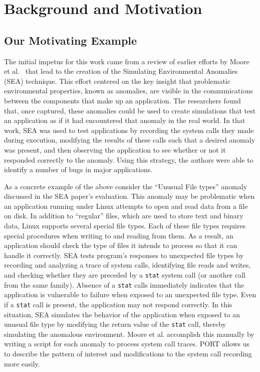 \section{Background and Motivation}
\label{SEC:background}


\subsection{Our Motivating Example}
\label{sec:MotivatingExample}

The initial impetus for this work came from a review
of earlier efforts by Moore et al.~\cite{DBLP:conf/issre/MooreCFW19}
that lead to the creation of
the Simulating Environmental Anomalies (SEA) technique.
This effort centered on the key insight
that problematic
environmental properties,
known as anomalies, are visible in the
communications between the components that make up an application.
The researchers found that,
once captured,
these anomalies
could be
used to create simulations
that test
an application as if
it had encountered that anomaly
in the real world.
In that work, SEA was used to test applications
by recording the system calls they made
during execution,
modifying the results of these calls such that a desired anomaly
was present,
and then observing the application to see whether or not it
responded correctly to the anomaly.
Using this strategy, the authors were able to identify a number of bugs
in major applications.

As a concrete example of the above
consider the ``Unusual File types'' anomaly
discussed in the SEA paper's evaluation.
This anomaly may be problematic
when an application running under Linux
attempts to open and read data from a file on disk.
In addition to ``regular'' files,
which are used to store text and
binary data,
Linux supports several special file types.
Each of these file types requires special procedures when writing to and
reading from them.
As a result, an application should check the type of files it intends to
process so that it can handle it correctly.
SEA tests program's responses
to unexpected file types
by recording and analyzing a trace of system calls,
identifying file reads and writes,
and checking whether they are preceded by a {\tt stat}
system call (or another call from the same family).
Absence of a {\tt stat} calls
immediately indicates
that the application is vulnerable
to failure
when exposed to an unexpected file type.
Even if a {\tt stat} call is present,
the application may not respond correctly.
In this situation,
SEA simulates
the behavior
of the application
when exposed
to an unusual file type
by modifying the return value
of the {\tt stat} call,
thereby simulating the anomalous environment.
Moore et al. accomplish this manually
by writing a script
for each anomaly
to process system call traces.
PORT allows us to describe
the pattern of interest
and modifications
to the system call recording
more easily.

